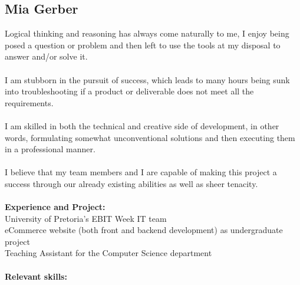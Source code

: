 \documentclass[12pt,a4paper]{article}
\begin{document}
		\subsection{Mia Gerber}
		Logical thinking and reasoning has always come naturally to me, I enjoy being posed a question or problem and then left to use the tools at my disposal to answer and/or solve it.\\\\
I am stubborn in the pursuit of success, which leads to many hours being sunk into troubleshooting if a product or deliverable does not meet all the requirements.\\\\
I am skilled in both the technical and creative side of development, in other words, formulating somewhat unconventional solutions and then executing them in a professional manner.\\\\
I believe that my team members and I are capable of making this project a success through our already existing abilities as well as sheer tenacity.\\\\
		\textbf{\small Experience and Project:}\\
		University of Pretoria’s EBIT Week IT team\\
		eCommerce website (both front and backend development) as undergraduate project\\
		Teaching Assistant for the Computer Science department\\\\
		\textbf{\small Relevant skills:}
\end{document}
